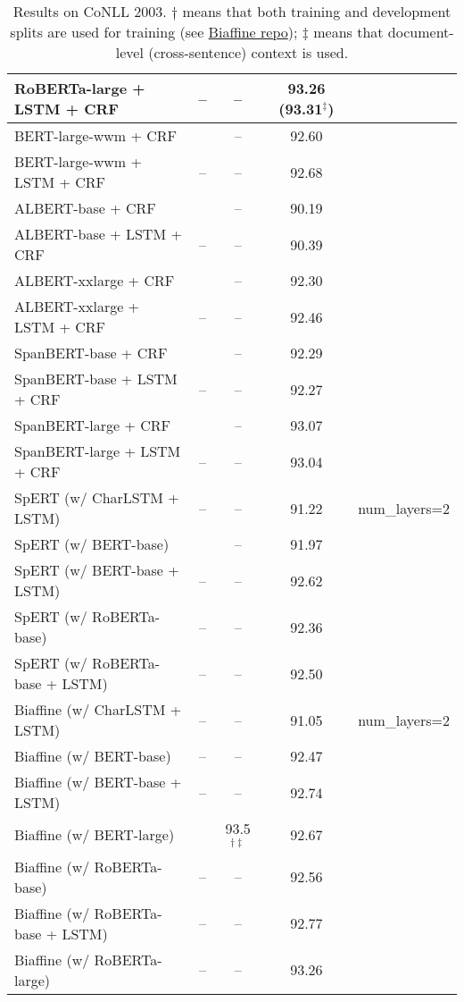 \documentclass{article}
\begin{document}
\begin{table}[H]
\begin{tabular}{lcccc}
    RoBERTa-large + LSTM + CRF  & --                     & --            & 93.26 (93.31$^\ddagger$) \\
    \midrule
    BERT-large-wwm + CRF        & \citet{devlin2019bert} & -- & 92.60 \\
    BERT-large-wwm + LSTM + CRF & --                     & -- & 92.68 \\
    \midrule
    ALBERT-base + CRF           & \citet{lan2019albert}  & -- & 90.19 \\
    ALBERT-base + LSTM + CRF    & --                     & -- & 90.39 \\
    ALBERT-xxlarge + CRF        & \citet{lan2019albert}  & -- & 92.30 \\
    ALBERT-xxlarge + LSTM + CRF & --                     & -- & 92.46 \\
    \midrule
    SpanBERT-base + CRF         & \citet{joshi2020spanbert} & -- & 92.29 \\
    SpanBERT-base + LSTM + CRF  & --                        & -- & 92.27 \\
    SpanBERT-large + CRF        & \citet{joshi2020spanbert} & -- & 93.07 \\
    SpanBERT-large + LSTM + CRF & --                        & -- & 93.04 \\
    \midrule
    SpERT (w/ CharLSTM + LSTM)     & --                     & -- & 91.22 & num\_layers=2 \\
    SpERT (w/ BERT-base)           & \citet{eberts2019span} & -- & 91.97 \\
    SpERT (w/ BERT-base + LSTM)    & --                     & -- & 92.62 \\
    SpERT (w/ RoBERTa-base)        & --                     & -- & 92.36 \\
    SpERT (w/ RoBERTa-base + LSTM) & --                     & -- & 92.50 \\ 
    \midrule
    Biaffine (w/ CharLSTM + LSTM)     & --                  & --         & 91.05 & num\_layers=2 \\
    Biaffine (w/ BERT-base)           & --                  & --         & 92.47 \\ 
    Biaffine (w/ BERT-base + LSTM)    & --                  & --         & 92.74 \\ 
    Biaffine (w/ BERT-large)          & \citet{yu2020named} & 93.5$^{\dagger\ddagger}$ & 92.67 \\
    Biaffine (w/ RoBERTa-base)        & --                  & --         & 92.56 \\ 
    Biaffine (w/ RoBERTa-base + LSTM) & --                  & --         & 92.77 \\ 
    Biaffine (w/ RoBERTa-large)       & --                  & --         & 93.26 \\
    \bottomrule
    \end{tabular}
    \caption{Results on CoNLL 2003. $\dagger$ means that both training and development splits are used for training (see \href{https://github.com/juntaoy/biaffine-ner/issues/16}{Biaffine repo}); $\ddagger$ means that document-level (cross-sentence) context is used.}
\end{table}
\end{document}
